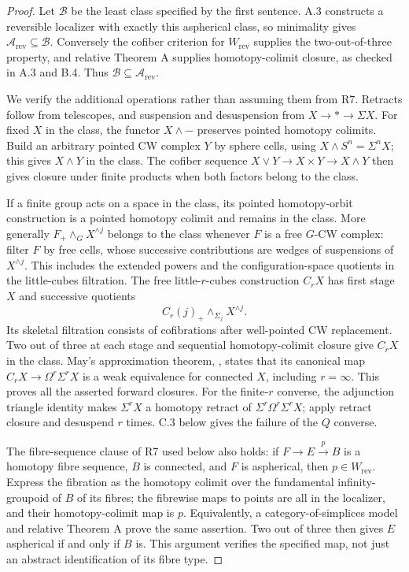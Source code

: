 \begin{proof}
Let $\mathcal B$ be the least class specified by the first sentence. A.3 constructs a reversible localizer with exactly this aspherical class, so minimality gives $\mathcal A_{\mathrm{rev}}\subseteq\mathcal B$. Conversely the cofiber criterion for $W_{\mathrm{rev}}$ supplies the two-out-of-three property, and relative Theorem A supplies homotopy-colimit closure, as checked in A.3 and B.4. Thus $\mathcal B\subseteq\mathcal A_{\mathrm{rev}}$.

We verify the additional operations rather than assuming them from R7. Retracts follow from telescopes, and suspension and desuspension from $X\to *\to\Sigma X$. For fixed $X$ in the class, the functor $X\wedge -$ preserves pointed homotopy colimits. Build an arbitrary pointed CW complex $Y$ by sphere cells, using $X\wedge S^n=\Sigma^nX$; this gives $X\wedge Y$ in the class. The cofiber sequence $X\vee Y\to X\times Y\to X\wedge Y$ then gives closure under finite products when both factors belong to the class.

If a finite group acts on a space in the class, its pointed homotopy-orbit construction is a pointed homotopy colimit and remains in the class. More generally $F_+\wedge_G X^{\wedge j}$ belongs to the class whenever $F$ is a free $G$-CW complex: filter $F$ by free cells, whose successive contributions are wedges of suspensions of $X^{\wedge j}$. This includes the extended powers and the configuration-space quotients in the little-cubes filtration. The free little-$r$-cubes construction $C_rX$ has first stage $X$ and successive quotients
\[
 C_r(j)_+\wedge_{\Sigma_j}X^{\wedge j}.
\]
Its skeletal filtration consists of cofibrations after well-pointed CW replacement. Two out of three at each stage and sequential homotopy-colimit closure give $C_rX$ in the class. May's approximation theorem, \cite[Theorem 6.1]{May1972}, states that its canonical map $C_rX\to\Omega^r\Sigma^rX$ is a weak equivalence for connected $X$, including $r=\infty$. This proves all the asserted forward closures. For the finite-$r$ converse, the adjunction triangle identity makes $\Sigma^rX$ a homotopy retract of $\Sigma^r\Omega^r\Sigma^rX$; apply retract closure and desuspend $r$ times. C.3 below gives the failure of the $Q$ converse.

The fibre-sequence clause of R7 used below also holds: if $F\to E\xrightarrow{p}B$ is a homotopy fibre sequence, $B$ is connected, and $F$ is aspherical, then $p\in W_{\mathrm{rev}}$. Express the fibration as the homotopy colimit over the fundamental infinity-groupoid of $B$ of its fibres; the fibrewise maps to points are all in the localizer, and their homotopy-colimit map is $p$. Equivalently, a category-of-simplices model and relative Theorem A prove the same assertion. Two out of three then gives $E$ aspherical if and only if $B$ is. This argument verifies the specified map, not just an abstract identification of its fibre type.
\end{proof}

